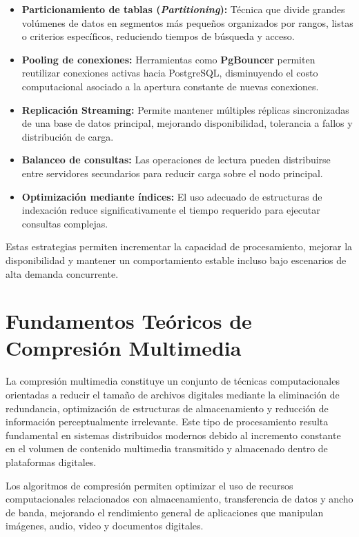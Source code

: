 \documentclass[12pt, oneside, letterpaper]{book}
\begin{document}
\begin{itemize}

\item \textbf{Particionamiento de tablas (\textit{Partitioning}):} Técnica que divide grandes volúmenes de datos en segmentos más pequeños organizados por rangos, listas o criterios específicos, reduciendo tiempos de búsqueda y acceso.

\item \textbf{Pooling de conexiones:} Herramientas como \textbf{PgBouncer} permiten reutilizar conexiones activas hacia PostgreSQL, disminuyendo el costo computacional asociado a la apertura constante de nuevas conexiones.

\item \textbf{Replicación Streaming:} Permite mantener múltiples réplicas sincronizadas de una base de datos principal, mejorando disponibilidad, tolerancia a fallos y distribución de carga.

\item \textbf{Balanceo de consultas:} Las operaciones de lectura pueden distribuirse entre servidores secundarios para reducir carga sobre el nodo principal.

\item \textbf{Optimización mediante índices:} El uso adecuado de estructuras de indexación reduce significativamente el tiempo requerido para ejecutar consultas complejas.
\end{itemize}

Estas estrategias permiten incrementar la capacidad de procesamiento, mejorar la disponibilidad y mantener un comportamiento estable incluso bajo escenarios de alta demanda concurrente.


\section{Fundamentos Teóricos de Compresión Multimedia}

La compresión multimedia constituye un conjunto de técnicas computacionales orientadas a reducir el tamaño de archivos digitales mediante la eliminación de redundancia, optimización de estructuras de almacenamiento y reducción de información perceptualmente irrelevante. Este tipo de procesamiento resulta fundamental en sistemas distribuidos modernos debido al incremento constante en el volumen de contenido multimedia transmitido y almacenado dentro de plataformas digitales.

Los algoritmos de compresión permiten optimizar el uso de recursos computacionales relacionados con almacenamiento, transferencia de datos y ancho de banda, mejorando el rendimiento general de aplicaciones que manipulan imágenes, audio, video y documentos digitales.
\end{document}
